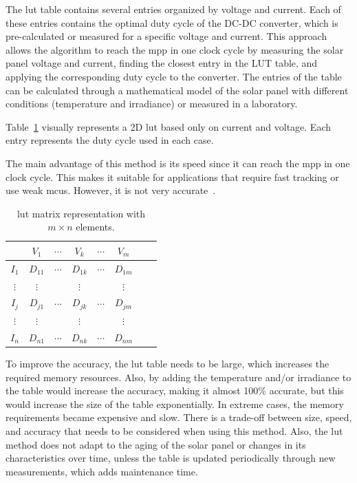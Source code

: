             The \acs{lut} table contains several entries organized by voltage and current. Each of these entries contains the optimal duty cycle of the DC-DC converter, which is pre-calculated or measured for a specific voltage and current. This approach allows the algorithm to reach the \acs{mpp} in one clock cycle by measuring the solar panel voltage and current, finding the closest entry in the LUT table, and applying the corresponding duty cycle to the converter. The entries of the table can be calculated through a mathematical model of the solar panel with different conditions (temperature and irradiance) or measured in a laboratory.

            Table~\ref{tab:LUT_matrix} visually represents a 2D \acs{lut} based only on current and voltage. Each entry represents the duty cycle used in each case.

            The main advantage of this method is its speed since it can reach the \ac{mpp} in one clock cycle. This makes it suitable for applications that require fast tracking or use weak \acp{mcu}. However, it is not very accurate~\cite{Look-Up-Table_VS_PeO}.

            \begin{table}[ht]
                \centering
                \caption{\acs{lut} matrix representation with $m \times n$ elements.}
                \label{tab:LUT_matrix}
                \renewcommand{\arraystretch}{1.3}
                \begin{tabular}{c|ccccccc}
                    & $V_1$ & $\cdots$ & $V_k$ & $\cdots$ & $V_m$ \\
                    \hline
                    $I_1$ & $D_{11}$ & $\cdots$ & $D_{1k}$ & $\cdots$ & $D_{1m}$ \\
                    $\vdots$ & $\vdots$ &  & $\vdots$ &  & $\vdots$ \\
                    $I_j$ & $D_{j1}$ & $\cdots$ & $D_{jk}$ & $\cdots$ & $D_{jm}$ \\
                    $\vdots$ & $\vdots$ &  & $\vdots$ &  & $\vdots$ \\
                    $I_n$ & $D_{n1}$ & $\cdots$ & $D_{nk}$ & $\cdots$ & $D_{nm}$
                \end{tabular}
            \end{table}

            To improve the accuracy, the \acs{lut} table needs to be large, which increases the required memory resources. Also, by adding the temperature and/or irradiance to the table would increase the accuracy, making it almost 100\% accurate, but this would increase the size of the table exponentially. In extreme cases, the memory requirements became expensive and slow. There is a trade-off between size, speed, and accuracy that needs to be considered when using this method. Also, the \acs{lut} method does not adapt to the aging of the solar panel or changes in its characteristics over time, unless the table is updated periodically through new measurements, which adds maintenance time.
            

